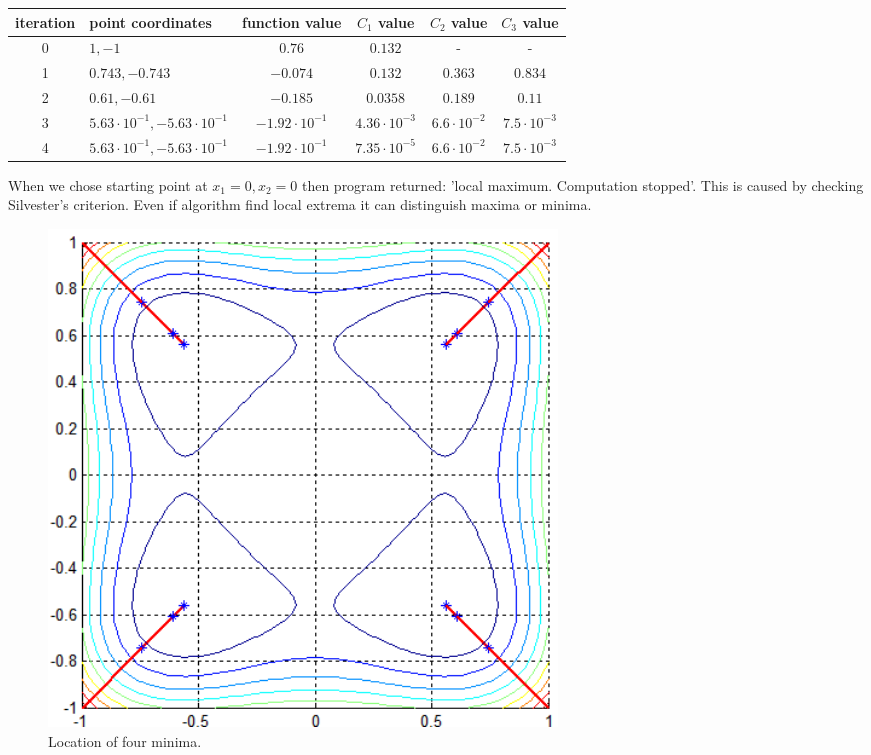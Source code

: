 \documentclass[12pt]{article}
\begin{document}
	\begin{table}[H]
		\begin{tabularx}{\textwidth}{c|X|c|c|c|c|}
			iteration & point coordinates & function value & $C_1$ value & $C_2$ value & $C_3$ value\\
			\hline	
			0 & $1, -1$ & $0.76$ & $0.132$ & - & - \\
			\hline					
			1 & $0.743, -0.743$ & $-0.074$ & $0.132$ & $0.363$ & $0.834$ \\ 
			\hline 
			2 & $0.61, -0.61$ & $-0.185$ & $0.0358$ & $0.189$ & $0.11$ \\ 
			\hline
			3 & $5.63\cdot10^{-1}, -5.63\cdot10^{-1}$  & $-1.92\cdot10^{-1}$ & $4.36\cdot10^{-3}$ & $6.6\cdot10^{-2}$ & $7.5\cdot10^{-3}$ \\ 
			\hline
			4 & $5.63\cdot10^{-1}, -5.63\cdot10^{-1}$  & $-1.92\cdot10^{-1}$ &
			$7.35\cdot10^{-5}$ & $6.6\cdot10^{-2}$ & $7.5\cdot10^{-3}$ \\ \hline
		\end{tabularx}		 
	\end{table}
	When we chose starting point at $x_1=0, x_2=0$ then program returned: 'local maximum. Computation stopped'. This is caused by checking Silvester's criterion. Even if algorithm find local extrema it can distinguish maxima or minima. 
	
	\begin{figure}[H]
		\begin{center}
			\includegraphics[width=13.5cm]{four_results.png}
			\caption{Location of four minima.}
		\end{center}
	\end{figure}
\end{document}
